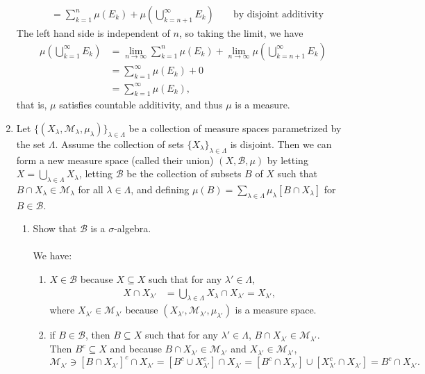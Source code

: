 \begin{enumerate}
\begin{align*}
		&=\sum_{k=1}^n\mu( E_k)+\mu(\bigcup_{k={n+1}}^\infty E_k)&&\text{ by disjoint additivity}
	\end{align*}
	The left hand side is independent of $n$, so taking the limit, we have
	\begin{align*}
		\mu(\bigcup_{k=1}^\infty E_k)&=\lim_{n\to\infty}\sum_{k=1}^n\mu( E_k)+\lim_{n\to\infty}\mu(\bigcup_{k={n+1}}^\infty E_k)\\
		&=\sum_{k=1}^\infty\mu( E_k)+0\\
		&=\sum_{k=1}^\infty\mu( E_k),
	\end{align*}
	that is, $\mu$ satisfies countable additivity, and thus $\mu$ is a measure.
	\item Let $\{(X_\lambda,\mathcal{M}_\lambda,\mu_\lambda)\}_{\lambda\in\Lambda}$ be a collection of measure spaces parametrized by the set $\Lambda$.
	Assume the collection of sets $\{X_\lambda\}_{\lambda\in\Lambda}$ is disjoint.
	Then we can form a new measure space (called their union) $(X,\mathcal{B},\mu)$ by letting $X=\bigcup_{\lambda\in\Lambda}X_\lambda$, letting $\mathcal{B}$ be the collection of subsets $B$ of $X$ such that $B\cap X_\lambda\in\mathcal{M}_\lambda$ for all $\lambda\in\Lambda$, and defining $\mu(B)=\sum_{\lambda\in\Lambda}\mu_\lambda[B\cap X_\lambda]$ for $B\in\mathcal{B}$.
	\begin{enumerate}[label=(\roman*),align=left]   
		\item Show that $\mathcal{B}$ is a $\sigma$-algebra.\\
		\\We have:
		\begin{enumerate}[label=(\roman*),align=left]   
			\item $X\in\mathcal{B}$ because $X\subseteq X$ such that for any $\lambda'\in\Lambda$,
			\begin{align*}
				X\cap X_{\lambda'}&= \bigcup_{\lambda\in\Lambda}X_\lambda\cap X_{\lambda'}= X_{\lambda'},
			\end{align*}
			where $X_{\lambda'}\in\mathcal{M}_{\lambda'}$ because $(X_{\lambda'},\mathcal{M}_{\lambda'},\mu_{\lambda'})$ is a measure space.
			\item if $B\in\mathcal{B}$, then $B\subseteq X$ such that for any $\lambda'\in\Lambda$, $B\cap X_{\lambda'}\in\mathcal{M}_{\lambda'}$.\\
			Then $B^c\subseteq X$ and because $ B\cap X_{\lambda'}\in\mathcal{M}_{\lambda'}$ and $X_{\lambda'}\in\mathcal{M}_{\lambda'}$,
			\[
				\mathcal{M}_{\lambda'}\ni[ B\cap X_{\lambda'}]^c\cap X_{\lambda'}=[B^c\cup X_{\lambda'}^c]\cap X_{\lambda'}=[B^c\cap X_{\lambda'}]\cup[X_{\lambda'}^c\cap X_{\lambda'}]=B^c\cap X_{\lambda'}.
\]
\end{enumerate}
\end{enumerate}
\end{enumerate}
